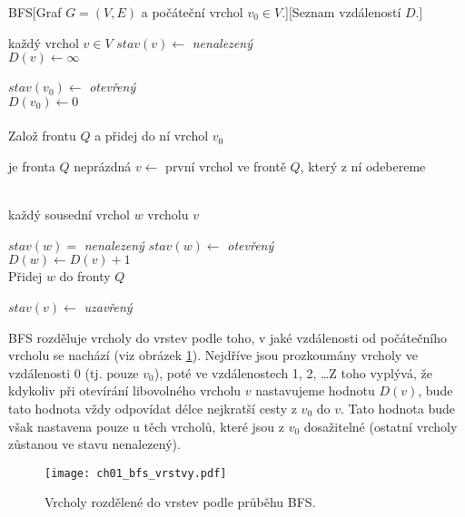 \begin{pseudo}{BFS}[Graf $G=(V,E)$ a počáteční vrchol $v_0\in V$.][Seznam vzdáleností $D$.]
    \begin{For}{každý vrchol $v\in V$}
        $stav(v)\gets$ \textit{nenalezený}\\
        $D(v)\gets\infty$
    \end{For}
    $stav(v_0)\gets$ \textit{otevřený}\\
    $D(v_0)\gets 0$\\\\
    Založ frontu $Q$ a přidej do ní vrchol $v_0$\\
    \begin{While}{je fronta $Q$ neprázdná}
        $v\gets$ první vrchol ve frontě $Q$, který z ní odebereme\\\\
        \begin{For}{každý sousední vrchol $w$ vrcholu $v$}
            \begin{If}{$stav(w)=$ \textit{nenalezený}}
                $stav(w)\gets$ \textit{otevřený}\\
                $D(w)\gets D(v)+1$\\
                Přidej $w$ do fronty $Q$
            \end{If}
        \end{For}
        $stav(v)\gets$ \textit{uzavřený}
    \end{While}
\end{pseudo}

BFS rozděluje vrcholy do vrstev podle toho, v jaké vzdálenosti od počátečního vrcholu se nachází (viz obrázek \ref{fig:bfs_vrstvy}). Nejdříve jsou prozkoumány vrcholy ve vzdálenosti 0 (tj. pouze $v_0$), poté ve vzdálenostech 1, 2, \dots Z toho vyplývá, že kdykoliv při otevírání libovolného vrcholu $v$ nastavujeme hodnotu $D(v)$, bude tato hodnota vždy odpovídat délce nejkratší cesty z $v_0$ do $v$. Tato hodnota bude však nastavena pouze u těch vrcholů, které jsou z $v_0$ dosažitelné (ostatní vrcholy zůstanou ve stavu nenalezený).
\begin{figure}[h]
    \centering
    \texttt{[image: ch01\_bfs\_vrstvy.pdf]}
    \caption{Vrcholy rozdělené do vrstev podle průběhu BFS.}
    \label{fig:bfs_vrstvy}
\end{figure}

